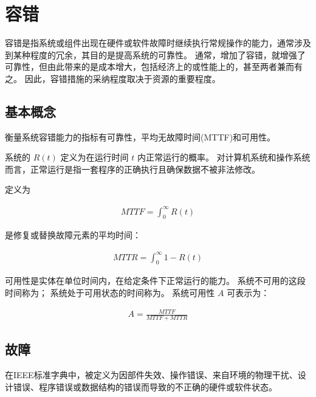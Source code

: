 
\section{容错}
{
    容错是指系统或组件出现在硬件或软件故障时继续执行常规操作的能力，通常涉及到某种程度的冗余，其目的是提高系统的可靠性。
    通常，增加了容错，就增强了可靠性，但由此带来的是成本增大，包括经济上的或性能上的，甚至两者兼而有之。
    因此，容错措施的采纳程度取决于资源的重要程度。

    \subsection{基本概念}
    {
        衡量系统容错能力的指标有可靠性，平均无故障时间(MTTF)和可用性。

        系统的 $R(t)$ 定义为在运行时间 $t$ 内正常运行的概率。
        对计算机系统和操作系统而言，正常运行是指一套程序的正确执行且确保数据不被非法修改。

        定义为

        \begin{align*}
            MTTF = \int^{\infty}_0 R(t)
        \end{align*}

        是修复或替换故障元素的平均时间：

        \begin{align*}
            MTTR = \int^{\infty}_0 1 - R(t)
        \end{align*}

        可用性是实体在单位时间内，在给定条件下正常运行的能力。
        系统不可用的这段时间称为；
        系统处于可用状态的时间称为。
        系统可用性 $A$ 可表示为：

        \begin{align*}
            A = \frac{MTTF}{MTTF + MTTR}
        \end{align*}
    }

    \subsection{故障}
    {
        在IEEE标准字典中，被定义为因部件失效、操作错误、来自环境的物理干扰、设计错误、程序错误或数据结构的错误而导致的不正确的硬件或软件状态。

}}

